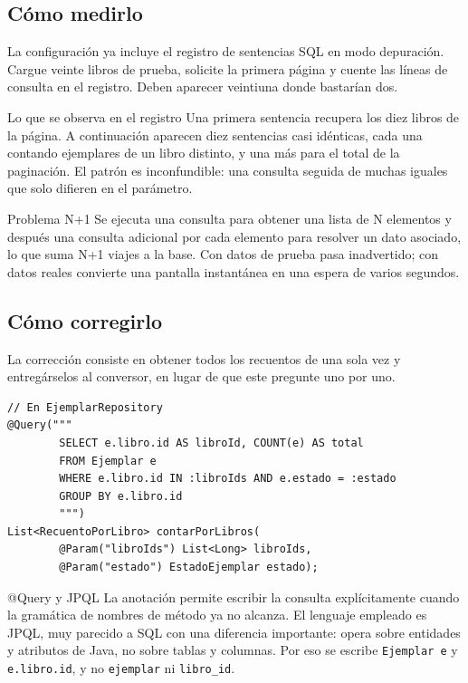 \documentclass[11pt,a4paper,openany]{book}
\begin{document}
\subsection{Cómo medirlo}
\label{sec:medir-n1}

La configuración ya incluye el registro de sentencias SQL en modo depuración. Cargue veinte libros de prueba, solicite la primera página y cuente las líneas de consulta en el registro. Deben aparecer veintiuna donde bastarían dos.

\begin{cajaejemplo}{Lo que se observa en el registro}
	Una primera sentencia recupera los diez libros de la página. A continuación aparecen diez sentencias casi idénticas, cada una contando ejemplares de un libro distinto, y una más para el total de la paginación. El patrón es inconfundible: una consulta seguida de muchas iguales que solo difieren en el parámetro.
\end{cajaejemplo}

\begin{cajadefinicion}{Problema N+1}
	Se ejecuta una consulta para obtener una lista de N elementos y después una consulta adicional por cada elemento para resolver un dato asociado, lo que suma N+1 viajes a la base. Con datos de prueba pasa inadvertido; con datos reales convierte una pantalla instantánea en una espera de varios segundos.
\end{cajadefinicion}

\subsection{Cómo corregirlo}
\label{sec:corregir-n1}

La corrección consiste en obtener todos los recuentos de una sola vez y entregárselos al conversor, en lugar de que este pregunte uno por uno.

\begin{lstlisting}[style=java,caption={Consulta agrupada que sustituye a las N consultas individuales.},label={lst:fix-n1}]
// En EjemplarRepository
@Query("""
		SELECT e.libro.id AS libroId, COUNT(e) AS total
		FROM Ejemplar e
		WHERE e.libro.id IN :libroIds AND e.estado = :estado
		GROUP BY e.libro.id
		""")
List<RecuentoPorLibro> contarPorLibros(
		@Param("libroIds") List<Long> libroIds,
		@Param("estado") EstadoEjemplar estado);
\end{lstlisting}

\begin{cajadefinicion}{@Query y JPQL}
	La anotación permite escribir la consulta explícitamente cuando la gramática de nombres de método ya no alcanza. El lenguaje empleado es JPQL, muy parecido a SQL con una diferencia importante: opera sobre entidades y atributos de Java, no sobre tablas y columnas. Por eso se escribe \texttt{Ejemplar e} y \texttt{e.libro.id}, y no \texttt{ejemplar} ni \texttt{libro\_id}.
\end{cajadefinicion}
\end{document}
